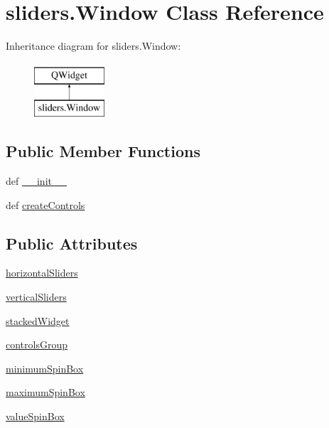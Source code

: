 \hypertarget{classsliders_1_1Window}{}\section{sliders.\+Window Class Reference}
\label{classsliders_1_1Window}
Inheritance diagram for sliders.\+Window\+:\begin{figure}[H]
\begin{center}
\leavevmode
\includegraphics[height=2.000000cm]{classsliders_1_1Window}
\end{center}
\end{figure}
\subsection*{Public Member Functions}
\begin{DoxyCompactItemize}
\item 
def \hyperlink{classsliders_1_1Window_a339c947eee695e6ec7b7b7e777e11319}{\+\_\+\+\_\+init\+\_\+\+\_\+}
\item 
def \hyperlink{classsliders_1_1Window_a61b24084f74a1f97c39b5d7b52015139}{create\+Controls}
\end{DoxyCompactItemize}
\subsection*{Public Attributes}
\begin{DoxyCompactItemize}
\item 
\hyperlink{classsliders_1_1Window_af5f0180f0033d6a78705eb215954ac9b}{horizontal\+Sliders}
\item 
\hyperlink{classsliders_1_1Window_a011731f519f383ab707c2677c9c48703}{vertical\+Sliders}
\item 
\hyperlink{classsliders_1_1Window_a5314a29461652c891f979a32a0039511}{stacked\+Widget}
\item 
\hyperlink{classsliders_1_1Window_a29ce2b7b3b93558e326a09802e819c85}{controls\+Group}
\item 
\hyperlink{classsliders_1_1Window_a6e6ff81f3ef4d4d05eb2f0810a19da11}{minimum\+Spin\+Box}
\item 
\hyperlink{classsliders_1_1Window_aa8d0fd8d507dea98f86c5044e5b54fa5}{maximum\+Spin\+Box}
\item 
\hyperlink{classsliders_1_1Window_a968a7a628fbc6fb38dce068985e65bcb}{value\+Spin\+Box}
\end{DoxyCompactItemize}


